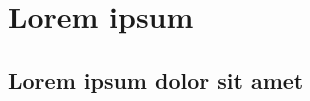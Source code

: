 \documentclass{subfiles}
\begin{document}
  \chapter{Lorem ipsum}
  \label{chap:2}

    \section{Lorem ipsum dolor sit amet}
    \label{sec:2.1}

      \paragraph{}
      \lipsum[1]
      
      \paragraph{}
      \lipsum[2]
      
      \paragraph{}
      \lipsum[3]
      
      \paragraph{}
      \lipsum[4]
      
      \paragraph{}
      \lipsum[5]
      
      \paragraph{}
      \lipsum[6]
      
      \paragraph{}
      \lipsum[7]
\end{document}
